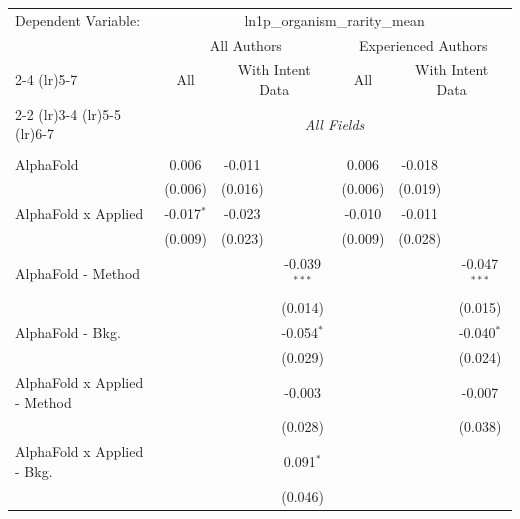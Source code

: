 \begingroup
\centering
\begin{tabular}{lcccccc}
   \tabularnewline \midrule \midrule
   Dependent Variable: & \multicolumn{6}{c}{ln1p\_organism\_rarity\_mean}\\
 & \multicolumn{3}{c}{All Authors} & \multicolumn{3}{c}{Experienced Authors} \\
\cmidrule(lr){2-4} \cmidrule(lr){5-7}
 & \multicolumn{1}{c}{All} & \multicolumn{2}{c}{With Intent Data} & \multicolumn{1}{c}{All} & \multicolumn{2}{c}{With Intent Data} \\
\cmidrule(lr){2-2} \cmidrule(lr){3-4} \cmidrule(lr){5-5} \cmidrule(lr){6-7}
 & \multicolumn{6}{c}{\textit{All Fields}} \\ \\
   AlphaFold                      & 0.006        & -0.011       &                & 0.006        & -0.018  &   \\   
                                  & (0.006)      & (0.016)      &                & (0.006)      & (0.019) &   \\   
   AlphaFold x Applied            & -0.017$^{*}$ & -0.023       &                & -0.010       & -0.011  &   \\   
                                  & (0.009)      & (0.023)      &                & (0.009)      & (0.028) &   \\   
   AlphaFold - Method             &              &              & -0.039$^{***}$ &              &         & -0.047$^{***}$\\   
                                  &              &              & (0.014)        &              &         & (0.015)\\   
   AlphaFold - Bkg.               &              &              & -0.054$^{*}$   &              &         & -0.040$^{*}$\\   
                                  &              &              & (0.029)        &              &         & (0.024)\\   
   AlphaFold x Applied - Method   &              &              & -0.003         &              &         & -0.007\\   
                                  &              &              & (0.028)        &              &         & (0.038)\\   
   AlphaFold x Applied - Bkg.     &              &              & 0.091$^{*}$    &              &         &   \\   
                                  &              &              & (0.046)        &              &         &   \\   

\end{tabular}
